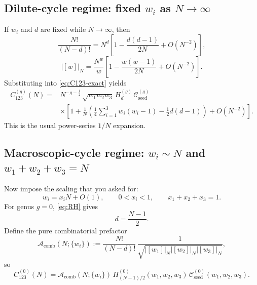 \documentclass[11pt]{article}
\newcommand{\mc}[1]{\mathcal{#1}}
\begin{document}
\subsection{Dilute-cycle regime: fixed \texorpdfstring{$w_i$}{wi} as \texorpdfstring{$N\to\infty$}{N->infty}}
If $w_i$ and $d$ are fixed while $N\to\infty$, then
\begin{equation}
\frac{N!}{(N-d)!}
=
N^d\left[
1-\frac{d(d-1)}{2N}+O(N^{-2})
\right],
\end{equation}
\begin{equation}
|[w]|_N
=
\frac{N^w}{w}
\left[
1-\frac{w(w-1)}{2N}+O(N^{-2})
\right].
\end{equation}
Substituting into \eqref{eq:C123-exact} yields
\begin{equation}\label{eq:dilute-expansion}
\begin{aligned}
C_{123}^{(g)}(N)
=&
N^{-g-\frac12}\,
\sqrt{w_1w_2w_3}\,
H_d^{(g)}\,
\mc C_{\mathrm{seed}}^{(g)}
\\
&\times
\left[
1+\frac{1}{N}
\left(
\frac14\sum_{i=1}^3 w_i(w_i-1)-\frac12 d(d-1)
\right)
+O(N^{-2})
\right].
\end{aligned}
\end{equation}
This is the usual power-series $1/N$ expansion.

\subsection{Macroscopic-cycle regime: \texorpdfstring{$w_i\sim N$}{wi~N} and \texorpdfstring{$w_1+w_2+w_3=N$}{sum wi=N}}
Now impose the scaling that you asked for:
\begin{equation}\label{eq:macro-scaling}
w_i=x_i N+O(1),
\qquad
0<x_i<1,
\qquad
x_1+x_2+x_3=1.
\end{equation}
For genus $g=0$, \eqref{eq:RH} gives
\begin{equation}\label{eq:d-macro}
d=\frac{N-1}{2}.
\end{equation}
Define the pure combinatorial prefactor
\begin{equation}\label{eq:Acomb-def}
\mc A_{\mathrm{comb}}(N;\{w_i\})
:=
\frac{N!}{(N-d)!}\,
\frac{1}{\sqrt{|[w_1]|_N|[w_2]|_N|[w_3]|_N}},
\end{equation}
so
\begin{equation}\label{eq:C-macro-factorized}
C_{123}^{(0)}(N)
=
\mc A_{\mathrm{comb}}(N;\{w_i\})\,
H_{(N-1)/2}^{(0)}(w_1,w_2,w_3)\,
\mc C_{\mathrm{seed}}^{(0)}(w_1,w_2,w_3).
\end{equation}
\end{document}
